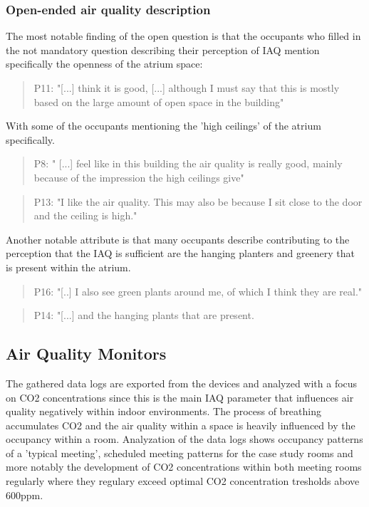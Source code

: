 \subsubsection{Open-ended air quality description}
The most notable finding of the open question is that the occupants who filled in the not mandatory question describing their perception of IAQ mention specifically the openness of the atrium space:

\begin{quote}
P11: "[...] think it is good, [...] although I must say that this is mostly based on the large amount of open space in the building"
\end{quote}

With some of the occupants mentioning the 'high ceilings' of the atrium specifically.

\begin{quote}
P8: " [...] feel like in this building the air quality is really good, mainly because of the impression the high ceilings give"
\end{quote}

\begin{quote}
P13: "I like the air quality. This may also be because I sit close to the door and the ceiling is high."
\end{quote}

Another notable attribute is that many occupants describe contributing to the perception that the IAQ is sufficient are the hanging planters and greenery that is present within the atrium.

\begin{quote}
P16: "[..] I also see green plants around me, of which I think they are real."
\end{quote}

\begin{quote}
P14: "[...] and the hanging plants that are present.
\end{quote}



\subsection{Air Quality Monitors}
\label{sec:monitor_analysis}

The gathered data logs are exported from the devices and analyzed with a focus on CO2 concentrations since this is the main IAQ parameter that influences air quality negatively within indoor environments. The process of breathing accumulates CO2 and the air quality within a space is heavily influenced by the occupancy within a room. Analyzation of the data logs shows occupancy patterns of a 'typical meeting', scheduled meeting patterns for the case study rooms and more notably the development of CO2 concentrations within both meeting rooms regularly where they regulary exceed optimal CO2 concentration tresholds above 600ppm.

